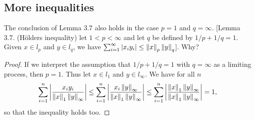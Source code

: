 \subsection{More inequalities}


\begin{exercise}{24}
The conclusion of Lemma 3.7 also holds in the case $p=1$ and $q=\infty$. [Lemma 3.7. (H\"olders inequality) let $1<p<\infty$ and let $q$ be defined by $1/p+1/q=1$. Given $x\in l_p$ and $y\in l_q$, we have $\sum_{i=1}^\infty \left\lvert x_iy_i\right\rvert\leq\left\lVert x\right\rVert_p\left\lVert y\right\rVert_q$]. Why?
\end{exercise}
\begin{proof}
If we interpret the assumption that $1/p+1/q=1$ with $q=\infty$ as a limiting process, then $p=1$. Thus let $x\in l_1$ and $y\in l_\infty$. We have for all $n$
\[
    \sum^n_{i=1}\left\lvert \frac{x_iy_i}{\left\lVert x\right\rVert_1\left\lVert y\right\rVert_\infty}\right\rvert
    \leq \sum^n_{i=1}\left\lvert \frac{x_i\left\lVert y\right\rVert_\infty}{\left\lVert x\right\rVert_1\left\lVert y\right\rVert_\infty}\right\rvert
    \leq \sum^n_{i=1}\left\lvert \frac{\left\lVert x\right\rVert_1\left\lVert y\right\rVert_\infty}{\left\lVert x\right\rVert_1\left\lVert y\right\rVert_\infty}\right\rvert 
    =1,
\]
so that the inequality holds too.
\end{proof} 

